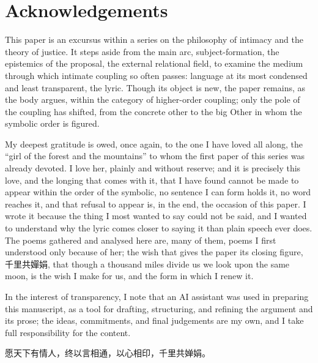 \documentclass[11pt,a4paper]{article}
\begin{document}
\tableofcontents
\clearpage



\section*{Acknowledgements}

This paper is an excursus within a series on the philosophy of intimacy and the theory of justice. It steps aside from the main arc, subject-formation, the epistemics of the proposal, the external relational field, to examine the medium through which intimate coupling so often passes: language at its most condensed and least transparent, the lyric. Though its object is new, the paper remains, as the body argues, within the category of higher-order coupling; only the pole of the coupling has shifted, from the concrete other to the big Other in whom the symbolic order is figured.

My deepest gratitude is owed, once again, to the one I have loved all along, the ``girl of the forest and the mountains'' to whom the first paper of this series was already devoted. I love her, plainly and without reserve; and it is precisely this love, and the longing that comes with it, that I have found cannot be made to appear within the order of the symbolic, no sentence I can form holds it, no word reaches it, and that refusal to appear is, in the end, the occasion of this paper. I wrote it because the thing I most wanted to say could not be said, and I wanted to understand why the lyric comes closer to saying it than plain speech ever does. The poems gathered and analysed here are, many of them, poems I first understood only because of her; the wish that gives the paper its closing figure, \cjkfont 千里共嬋娟\normalfont, that though a thousand miles divide us we look upon the same moon, is the wish I make for us, and the form in which I renew it.

In the interest of transparency, I note that an AI assistant was used in preparing this manuscript, as a tool for drafting, structuring, and refining the argument and its prose; the ideas, commitments, and final judgements are my own, and I take full responsibility for the content.

\begin{center}
{\cjkfont\color{rosedeep} 愿天下有情人，终以言相通，以心相印，千里共婵娟。}
\end{center}

\printbibliography[heading=bibintoc]
\end{document}
